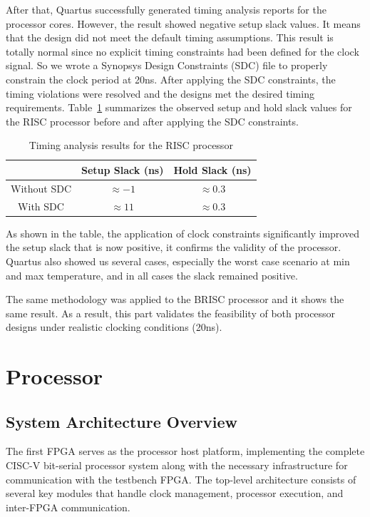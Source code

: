 \documentclass[12pt]{article}
\begin{document}
After that, Quartus successfully generated timing analysis reports for the processor cores. However, the result showed negative setup slack values. It means that the design did not meet the default timing assumptions. This result is totally normal since no explicit timing constraints had been defined for the clock signal. So we wrote a Synopsys Design Constraints (SDC) file to properly constrain the clock period at 20ns. After applying the SDC constraints, the timing violations were resolved and the designs met the desired timing requirements. Table~\ref{tab:risc_timing} summarizes the observed setup and hold slack values for the RISC processor before and after applying the SDC constraints.

\begin{table}[H]
\centering
\begin{tabular}{|c|c|c|}
\hline
 & Setup Slack (ns) & Hold Slack (ns) \\
\hline
Without SDC & $\approx -1$ & $\approx 0.3$ \\
With SDC    & $\approx 11$ & $\approx 0.3$ \\
\hline
\end{tabular}
\caption{Timing analysis results for the RISC processor}
\label{tab:risc_timing}
\end{table}


As shown in the table, the application of clock constraints significantly improved the setup slack that is now positive, it confirms the validity of the processor. Quartus also showed us several cases, especially the worst case scenario at min and max temperature, and in all cases the slack remained positive.

The same methodology was applied to the BRISC processor and it shows the same result. As a result, this part validates the feasibility of both processor designs under realistic clocking conditions (20ns).


\FloatBarrier
\section{Processor}

\subsection{System Architecture Overview}

The first FPGA serves as the processor host platform, implementing the complete CISC-V bit-serial processor system along with the necessary infrastructure for communication with the testbench FPGA. The top-level architecture consists of several key modules that handle clock management, processor execution, and inter-FPGA communication.
\end{document}
